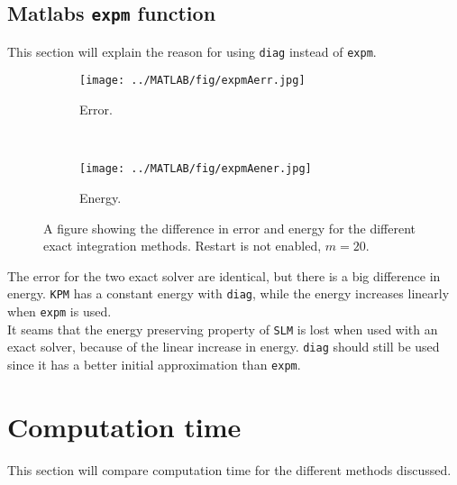 \subsection{Matlabs \texttt{expm} function} \label{sec:resultexpm} %
This section will explain the reason for using \texttt{diag} instead of \texttt{expm}.
\begin{figure}[H]
        \centering
		\begin{subfigure}[b]{0.45\textwidth}
                \texttt{[image: ../MATLAB/fig/expmAerr.jpg]}
                \caption{ Error. }
                \label{fig:expmSerr}
        \end{subfigure}%
        ~
        \begin{subfigure}[b]{0.45\textwidth}
                \texttt{[image: ../MATLAB/fig/expmAener.jpg]}
                \caption{ Energy. }
                \label{fig:expmSener}
        \end{subfigure}
        \caption{A figure showing the difference in error and energy for the different exact integration methods. Restart is not enabled, $m = 20$. }
        \label{fig:expm}
\end{figure}
\noindent The error for the two exact solver are identical, but there is a big difference in energy. \texttt{KPM} has a constant energy with \texttt{diag}, while the energy increases linearly when \texttt{expm} is used.\\
It seams that the energy preserving property of \texttt{SLM} is lost when used with an exact solver, because of the linear increase in energy. \texttt{diag} should still be used since it has a better initial approximation than \texttt{expm}. \\
\section{Computation time}%
\label{sec:cruntime}
This section will compare computation time for the different methods discussed. 


